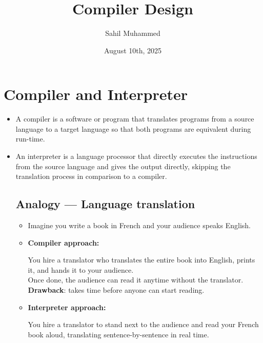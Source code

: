 \documentclass[hidelinks]{article}
\title{\textbf{Compiler Design}}
\author{Sahil Muhammed}
\date{August 10th, 2025}
\begin{document}
\hypersetup{bookmarksnumbered=true,}
\pagecolor{black}
\color{white}
\maketitle

\begin{Large}
\tableofcontents
\end{Large}%
\pagebreak

\section{Compiler and Interpreter}

\begin{itemize}
    \item A compiler is a software or program that translates programs from a source language to a target language so that both programs are equivalent during run-time.
    \item An interpreter is a language processor that directly executes the instructions from the source language and gives the output directly, skipping the translation process in comparison to a compiler.

    \subsection{Analogy — Language translation}

    \begin{itemize}
        \item Imagine you write a book in French and your audience speaks English.

        \item \textbf{Compiler approach:}

        You hire a translator who translates the entire book into English, prints it, and hands it to your audience. \\ 

        Once done, the audience can read it anytime without the translator. \\

        \textbf{Drawback}: takes time before anyone can start reading.

        \item \textbf{Interpreter approach:}

        You hire a translator to stand next to the audience and read your French book aloud, translating sentence-by-sentence in real time. \\


\end{itemize}
\end{itemize}
\end{document}
